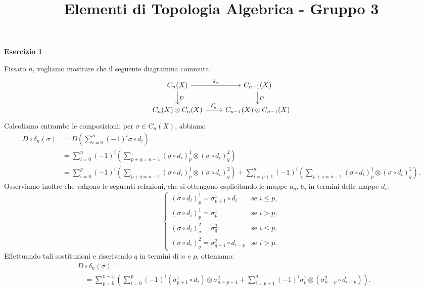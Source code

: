 \documentclass[a4paper]{article}
\title{Elementi di Topologia Algebrica - Gruppo 3\vspace{-1cm}}
\author{}
\theoremstyle{definition}
\theoremstyle{definition}
\theoremstyle{remark}
\theoremstyle{definition}
\begin{document}
\maketitle

\textbf{Esercizio 1}

Fissato $n$, vogliamo mostrare che il seguente diagramma commuta:
\[
    \begin{tikzcd}
        C_n(X) \arrow[r, "\delta_n"] \arrow[d, "D"] & C_{n-1}(X) \arrow[d, "D"] \\
        C_n(X)\otimes C_n(X) \arrow[r, "\delta_n^\prime"] & C_{n-1}(X)\otimes C_{n-1}(X)
    \end{tikzcd}
\]
Calcoliamo entrambe le composizioni: per $\sigma\in C_n(X)$, abbiamo
\begin{align*}
    D\circ\delta_n(\sigma) &= D\left(\sum_{i=0}^n (-1)^i\sigma\circ d_i\right)\\
                           &= \sum_{i=0}^n (-1)^i\left(\sum_{p+q=n-1} (\sigma\circ d_i)_p^1\otimes(\sigma\circ d_i)_q^2\right)\\
                           &= \sum_{i=0}^{p} (-1)^i\left(\sum_{p+q=n-1} (\sigma\circ d_i)_p^1\otimes(\sigma\circ d_i)_q^2\right) +  \sum_{i=p+1}^n (-1)^i\left(\sum_{p+q=n-1} (\sigma\circ d_i)_p^1\otimes(\sigma\circ d_i)_q^2\right).
\end{align*}
Osserviamo inoltre che valgono le seguenti relazioni, che si ottengono esplicitando le mappe $a_p$, $b_q$ in termini delle mappe $d_i$:
\[
\begin{cases}
    (\sigma\circ d_i)_p^1 = \sigma_{p+1}^1\circ d_i & \text{se } i\leq p,\\
    (\sigma\circ d_i)_p^1 = \sigma_p^1 & \text{se } i>p,\\
    (\sigma\circ d_i)_q^2 =  \sigma_q^2 & \text{se } i\leq p,\\
    (\sigma\circ d_i)_q^2 = \sigma_{q+1}^2\circ d_{i-p} & \text{se } i > p.
\end{cases}
\]
Effettuando tali sostituzioni e riscrivendo $q$ in termini di $n$ e $p$, otteniamo:
\begin{align*}
    &D   \circ \delta_n(\sigma) = \\
                               &\quad= \sum_{p=0}^{n-1} \left(\sum_{i=0}^{p} (-1)^i (\sigma_{p+1}^1\circ d_i)\otimes\sigma_{n-p-1}^2 +  \sum_{i=p+1}^n (-1)^i \sigma_p^1 \otimes (\sigma_{n-p}^2\circ {d_{i-p}} )\right).
\end{align*}
\end{document}
